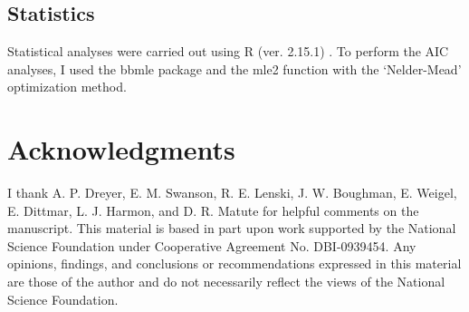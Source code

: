 \begin{doublespace}
\subsection{Statistics}

Statistical analyses were carried out using R (ver. 2.15.1) \citep{r13}.
%
To perform the AIC analyses, I used the bbmle package \citep{bol08}
and the mle2 function with the `Nelder-Mead' optimization method.
%




\section{Acknowledgments}

I thank A. P. Dreyer, E. M. Swanson, R. E. Lenski, J. W. Boughman,
E. Weigel, E. Dittmar, L. J. Harmon, and D. R. Matute
for helpful comments on the manuscript.
%
This material is based in part upon work supported
by the National Science Foundation under Cooperative Agreement No. DBI-0939454.
Any opinions, findings, and conclusions or recommendations
expressed in this material are those of the author
and do not necessarily reflect the views of the National Science Foundation.



\end{doublespace}

\begin{lit_cited}
\end{lit_cited}

\renewcommand\bibsection{\center\section*{\bibname}}




\renewcommand\bibsection{\section{\bibname}}
